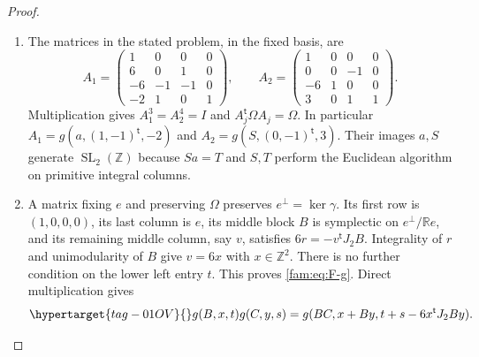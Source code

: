 \begin{proof}
\begin{enumerate}[label=\arabic*.,leftmargin=*]
\item The matrices in the stated problem, in the fixed basis, are
\[
 A_1=\begin{pmatrix}1&0&0&0\\6&0&1&0\\-6&-1&-1&0\\-2&1&0&1\end{pmatrix},
 \qquad
 A_2=\begin{pmatrix}1&0&0&0\\0&0&-1&0\\-6&1&0&0\\3&0&1&1\end{pmatrix}.
\]
Multiplication gives $A_1^3=A_2^4=I$ and
$A_j^{\mathsf t}\Omega A_j=\Omega$.  In particular
$A_1=g(a,(1,-1)^{\mathsf t},-2)$ and
$A_2=g(S,(0,-1)^{\mathsf t},3)$.  Their images $a,S$ generate
$\operatorname{SL}_2(\mathbb Z)$ because $Sa=T$ and $S,T$ perform the
Euclidean algorithm on primitive integral columns.

\item A matrix fixing $e$ and preserving $\Omega$ preserves
$e^{\perp}=\ker\gamma$.  Its first row is $(1,0,0,0)$, its last column is
$e$, its middle block $B$ is symplectic on
$e^{\perp}/\mathbb Re$, and its remaining middle column, say $v$, satisfies
$6r=-v^{\mathsf t}J_2B$.  Integrality of $r$ and unimodularity of $B$
give $v=6x$ with $x\in\mathbb Z^2$.  There is no further condition on
the lower left entry $t$.  This proves \eqref{fam:eq:F-g}.  Direct multiplication
gives
\begin{equation}\hypertarget{tag-01OV}{}\label{fam:eq:F-law}
 g(B,x,t)g(C,y,s)
 =g(BC,x+By,t+s-6x^{\mathsf t}J_2By).
\end{equation}


\end{enumerate}
\end{proof}
